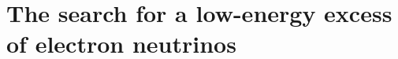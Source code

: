 \chapter{The search for a low-energy excess of electron neutrinos}\label{ch:6-analysis}

\minitoc





